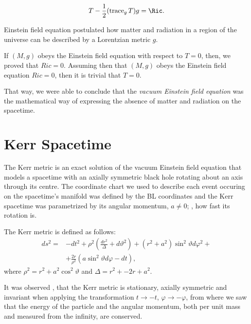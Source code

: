 \begin{equation}
\label{eq:einstein3}
T - \frac{1}{2}(\operatorname{trace}_g T)g = \Ric.
\end{equation}

Einstein field equation postulated how matter and radiation in a region of the universe can be described by a Lorentzian metric $g$.

If $(M,g)$ obeys the Einstein field equation with respect to $T = 0$, then, we proved that $Ric = 0$. Assuming then that $(M,g)$ obeys the Einstein field equation $Ric = 0$, then it is trivial that $T=0$.

That way, we were able to conclude that the \emph{vacuum Einstein field equation} was the mathematical way of expressing the absence of matter and radiation on the spacetime.



















\section{Kerr Spacetime}
\label{chapter:kerr}

The Kerr metric is an exact solution of the vacuum Einstein field equation that models a spacetime with an axially symmetric black hole rotating about an axis through its centre. The coordinate chart we used to describe each event occuring on the spacetime's manifold was defined by the \ac{BL} coordinates and the Kerr spacetime was parametrized by its angular momentum, $a \neq 0$; \ie, how fast its rotation is.

The Kerr metric is defined as follows:
\begin{align}
	\label{eq:kerrmetric}
	ds^2 = &-dt^2 + \rho^2\left(\frac{dr^2}{\Delta} + d\vartheta^2\right) + \left(r^2 + a^2\right)\sin^2\vartheta d\varphi^2 + \\
	\nonumber
	&+ \frac{2r}{\rho^2}\left(a\sin^2\vartheta d\varphi - dt\right),
\end{align}
where $\rho^2 = r^2 + a^2\cos^2\vartheta$ and $\Delta = r^2 + -2r + a^2$.

It was observed \cite[Sec. 2.1]{galindo14}, \cite[pp. 58-59]{oneill95} that the Kerr metric is stationary, axially symmetric and invariant when applying the transformation $t \to -t$, $\varphi \to -\varphi$, from where we saw that the energy of the particle and the angular momentum, both per unit mass and measured from the infinity, are conserved.

